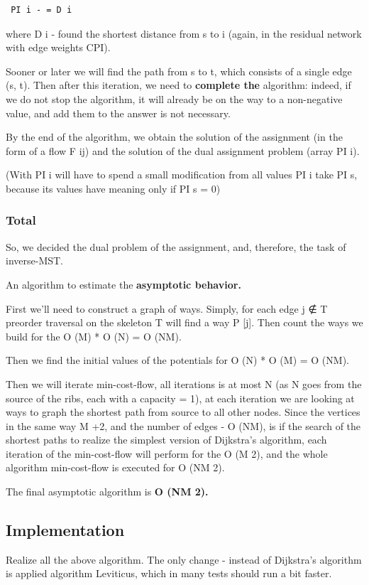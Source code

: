 \begin{verbatim}
 PI i - = D i 
\end{verbatim}
where D i - found the shortest distance from s to i (again, in the residual network with edge weights CPI).

Sooner or later we will find the path from s to t, which consists of a single edge (s, t). Then after this iteration, we need to \textbf{complete the} algorithm: indeed, if we do not stop the algorithm, it will already be on the way to a non-negative value, and add them to the answer is not necessary.

By the end of the algorithm, we obtain the solution of the assignment (in the form of a flow F ij) and the solution of the dual assignment problem (array PI i).

(With PI i will have to spend a small modification from all values ​​PI i take PI s, because its values ​​have meaning only if PI s = 0)

\subsubsection{ Total }
So, we decided the dual problem of the assignment, and, therefore, the task of inverse-MST.

An algorithm to estimate the \textbf{asymptotic behavior.}

First we'll need to construct a graph of ways. Simply, for each edge j ∉ T preorder traversal on the skeleton T will find a way P [j]. Then count the ways we build for the O (M) * O (N) = O (NM).

Then we find the initial values ​​of the potentials for O (N) * O (M) = O (NM).

Then we will iterate min-cost-flow, all iterations is at most N (as N goes from the source of the ribs, each with a capacity = 1), at each iteration we are looking at ways to graph the shortest path from source to all other nodes. Since the vertices in the same way M +2, and the number of edges - O (NM), is if the search of the shortest paths to realize the simplest version of Dijkstra's algorithm, each iteration of the min-cost-flow will perform for the O (M 2), and the whole algorithm min-cost-flow is executed for O (NM 2).

The final asymptotic algorithm is \textbf{O (NM 2).}

\subsection{ Implementation }
Realize all the above algorithm. The only change - instead of Dijkstra's algorithm is applied algorithm Leviticus, which in many tests should run a bit faster.

